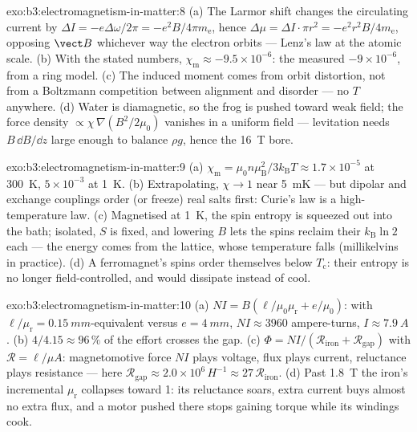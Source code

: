 \begin{solution}{exo:b3:electromagnetism-in-matter:8}
(a) The Larmor shift changes the circulating current by $\Delta I
= -e\Delta\omega/2\pi = -e^2B/4\pi m_{\text{e}}$, hence
$\Delta\mu = \Delta I\cdot\pi r^2 = -e^2r^2B/4m_{\text{e}}$,
opposing $\vect B$ whichever way the electron orbits ---
Lenz's law at the atomic scale. (b) With the stated numbers,
$\chi_{\text{m}} \approx -9.5\times10^{-6}$: the measured
$-9\times10^{-6}$, from a ring model. (c) The induced moment
comes from orbit distortion, not from a Boltzmann competition
between alignment and disorder --- no $T$ anywhere. (d) Water is
diamagnetic, so the frog is pushed toward weak field; the force
density $\propto \chi\,\nabla(B^2/2\mu_0)$ vanishes in a uniform
field --- levitation needs $B\,\dd B/\dd z$ large enough to
balance $\rho g$, hence the \qty{16}{T} bore.
\end{solution}

\begin{solution}{exo:b3:electromagnetism-in-matter:9}
(a) $\chi_{\text{m}} = \mu_0n\mu_{\text{B}}^2/3k_{\text{B}}T
\approx 1.7\times10^{-5}$ at \qty{300}{K}, $5\times10^{-3}$ at
\qty{1}{K}. (b) Extrapolating, $\chi \to 1$ near \qty{5}{mK} ---
but dipolar and exchange couplings order (or freeze) real salts
first: Curie's law is a high-temperature law. (c) Magnetised at
\qty{1}{K}, the spin entropy is squeezed out into the bath;
isolated, $S$ is fixed, and lowering $B$ lets the spins reclaim
their $k_{\text{B}}\ln 2$ each --- the energy comes from the
lattice, whose temperature falls (millikelvins in practice). (d)
A ferromagnet's spins order themselves below $T_{\text{c}}$: their
entropy is no longer field-controlled, and  would
dissipate instead of cool.
\end{solution}

\begin{solution}{exo:b3:electromagnetism-in-matter:10}
(a) $NI = B(\ell/\mu_0\mu_{\text{r}} + e/\mu_0)$: with
$\ell/\mu_{\text{r}} = \qty{0.15}{mm}$-equivalent versus $e =
\qty{4}{mm}$, $NI \approx 3960$ ampere-turns, $I \approx
\qty{7.9}{A}$. (b) $4/4.15 \approx 96\,\%$ of the effort crosses
the gap. (c) $\Phi = NI/(\mathcal R_{\text{iron}} +
\mathcal R_{\text{gap}})$ with $\mathcal R = \ell/\mu A$:
magnetomotive force $NI$ plays voltage, flux plays current,
reluctance plays resistance --- here $\mathcal R_{\text{gap}}
\approx 2.0\times10^{6}\,\unit{H^{-1}} \approx
27\,\mathcal R_{\text{iron}}$. (d) Past \qty{1.8}{T} the iron's
incremental $\mu_{\text{r}}$ collapses toward 1: its reluctance
soars, extra current buys almost no extra flux, and a motor pushed
there stops gaining torque while its windings cook.
\end{solution}

